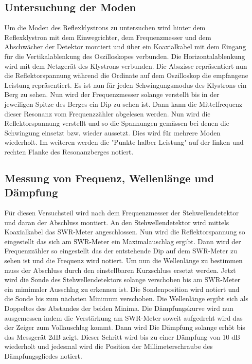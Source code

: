 \subsection{Untersuchung der Moden}
\label{sec:moden}
Um die Moden des Reflexklystrons zu untersuchen wird hinter dem Reflexklystron mit dem Einwegrichter, dem 
Frequenzmesser und dem Abschwächer der Detektor montiert und über ein Koaxialkabel mit dem Eingang
für die Vertikalablenkung des Oszilloskopes verbunden. Die Horizontalablenkung wird mit dem Netzgerät des Klystrons
verbunden. Die Abszisse repräsentiert nun die Reflektorspannung während die Ordinate auf dem Oszilloskop
die empfangene Leistung repräsentiert. Es ist nun für jeden Schwingungsmodus des Klystrons ein Berg zu sehen.
Nun wird der Frequenzmesser solange verstellt bis in der jeweiligen Spitze des Berges ein Dip zu sehen ist.
Dann kann die Mittelfrequenz dieser Resonanz vom Frequenzzähler abgelesen werden. Nun wird die Reflektorspannung
verstellt und so die Spannungen gemässen bei denen die Schwingung einsetzt bzw. wieder aussetzt. Dies wird für mehrere
Moden wiederholt. Im weiteren werden die "Punkte halber Leistung" auf der linken und rechten Flanke des 
Resonanzberges notiert.

\subsection{Messung von Frequenz, Wellenlänge und Dämpfung}
\label{sec:frequenzmessung}
Für diesen Versuchsteil wird nach dem Frequenzmesser der Stehwellendetektor und daran der Abschluss montiert.
An den Stehwellendetektor wird mittels Koaxialkabel das SWR-Meter angeschlossen. Nun wird die Reflektorspannung
so eingestellt das sich am SWR-Meter ein Maximalauschlag ergibt. Dann wird der Frequenzzähler so eingestellt das 
der entstehende Dip auf dem SWR-Meter zu sehen ist und die Frequenz wird notiert. Um nun die Wellenlänge zu bestimmen
muss der Abschluss durch den einstellbaren Kurzschluss ersetzt werden. Jetzt wird die Sonde des Stehwellendetektors
solange verschoben bis am SWR-Meter ein mimimaler Ausschlag zu erkennen ist. Die Sondenposition wird notiert und die
Sonde bis zum nächsten Minimum verschoben. Die Wellenlänge ergibt sich als Doppeltes des Abstandes der beiden 
Minima. Die Dämpfungskurve wird nun ausgemessen indem die Verstärkung am SWR-Meter soweit aufgedreht wird das 
der Zeiger zum Vollauschlag kommt. Dann wird Die Dämpfung solange erhöt bis das Messgerät 2dB zeigt. Dieser Schritt
wird bis zu einer Dämpfung von 10 dB wiederholt und jedesmal wird die Position der Millimeterschraube des 
Dämpfungsgliedes notiert.

